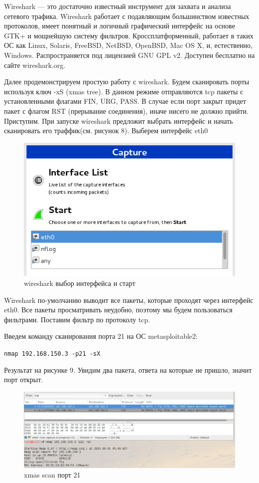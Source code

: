 \documentclass[11pt, a4paper]{article}		%
\begin{document}
Wireshark — это достаточно известный инструмент для захвата и анализа сетевого трафика.
Wireshark работает с подавляющим большинством известных протоколов, имеет понятный и логичный графический интерфейс на основе GTK+ и мощнейшую систему фильтров.
Кроссплатформенный, работает в таких ОС как Linux, Solaris, FreeBSD, NetBSD, OpenBSD, Mac OS X, и, естественно, Windows. Распространяется под лицензией GNU GPL v2. Доступен бесплатно на сайте wireshark.org.

Далее продемонстрируем простую работу с wireshark. 
Будем сканировать порты используя ключ -xS (xmas tree). В данном режиме отправляются tcp пакеты с установленными флагами FIN, URG, PASS.
В случае если порт закрыт придет пакет с флагом RST (прерывание соединения), иначе нисего не должно прийти. Приступим.
При запуске wireshark предложит выбрать интерфейс и начать сканировать его траффик(см. рисунок 8). Выберем интерфейс eth0

\begin{figure}[h!]
\centering
\includegraphics[scale=0.8]{res/wireshark_int}
\caption{wireshark выбор интерфейса и старт}
\end{figure}

Wireshark по-умолчанию выводит все пакеты, которые проходят через интерфейс eth0. Все пакеты просматривать неудобно, поэтому мы будем пользоваться фильтрами. Поставим фильтр по протоколу tcp.

Введем команду сканирования порта 21 на ОС metasploitable2: 

\verb'nmap 192.168.150.3 -p21 -sX'

Результат на рисунке 9. Увидим два пакета, ответа на которые не пришло, значит порт открыт.

\begin{figure}[h!]
\centering
\includegraphics[scale=0.8]{res/xmas_scan_21}
\caption{xmas scan порт 21}
\end{figure}
\end{document}
